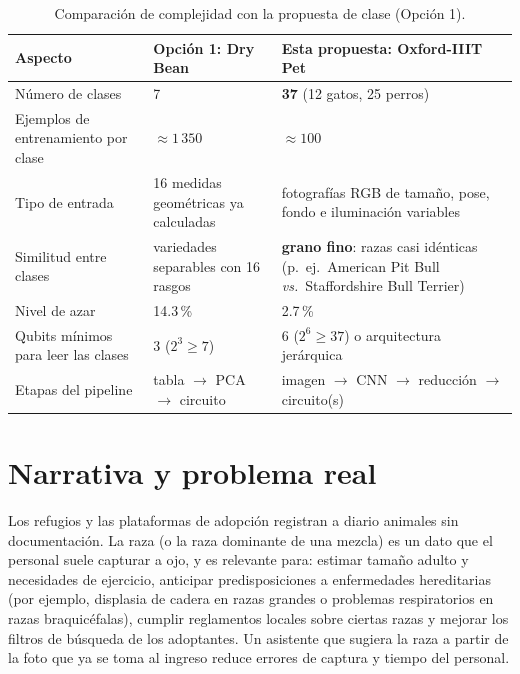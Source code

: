 \documentclass[11pt,letterpaper]{article}
\begin{document}
\begin{table}[H]
\centering\small
\caption{Comparación de complejidad con la propuesta de clase (Opción 1).}
\label{tab:complejidad}
\begin{tabular}{@{}p{5.2cm}p{4.2cm}p{5.4cm}@{}}
\toprule
Aspecto & Opción 1: Dry Bean & Esta propuesta: Oxford-IIIT Pet \\ \midrule
Número de clases & 7 & \textbf{37} (12 gatos, 25 perros) \\
Ejemplos de entrenamiento por clase & $\approx 1\,350$ & $\approx 100$ \\
Tipo de entrada & 16 medidas geométricas ya calculadas & fotografías RGB de tamaño, pose, fondo e iluminación variables \\
Similitud entre clases & variedades separables con 16 rasgos & \textbf{grano fino}: razas casi idénticas (p.\ ej.\ American Pit Bull \emph{vs.}\ Staffordshire Bull Terrier) \\
Nivel de azar & 14.3\,\% & 2.7\,\% \\
Qubits mínimos para leer las clases & 3 ($2^3\geq7$) & 6 ($2^6\geq37$) o arquitectura jerárquica \\
Etapas del pipeline & tabla $\to$ PCA $\to$ circuito & imagen $\to$ CNN $\to$ reducción $\to$ circuito(s) \\
\bottomrule
\end{tabular}
\end{table}

\section{Narrativa y problema real}
Los refugios y las plataformas de adopción registran a diario animales sin documentación. La raza
(o la raza dominante de una mezcla) es un dato que el personal suele capturar a ojo, y es relevante
para: estimar tamaño adulto y necesidades de ejercicio, anticipar predisposiciones a enfermedades
hereditarias (por ejemplo, displasia de cadera en razas grandes o problemas respiratorios en razas
braquicéfalas), cumplir reglamentos locales sobre ciertas razas y mejorar los filtros de búsqueda de
los adoptantes. Un asistente que sugiera la raza a partir de la foto que ya se toma al ingreso reduce
errores de captura y tiempo del personal.
\end{document}
